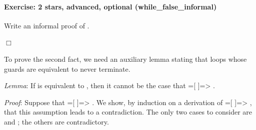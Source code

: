 \documentclass[12pt]{report}
\begin{document}
\paragraph{Exercise: 2 stars, advanced, optional (while\_false\_informal)}




    Write an informal proof of .


 \ensuremath{\Box} 

 To prove the second fact, we need an auxiliary lemma stating that
     loops whose guards are equivalent to  never
    terminate. 

 \textit{Lemma}: If  is equivalent to , then it cannot be
    the case that  =[      ]=> .


    \textit{Proof}: Suppose that  =[      ]=> .  We show,
    by induction on a derivation of  =[      ]=> ,
    that this assumption leads to a contradiction. The only two cases
    to consider are  and ; the others
    are contradictory.
\end{document}
